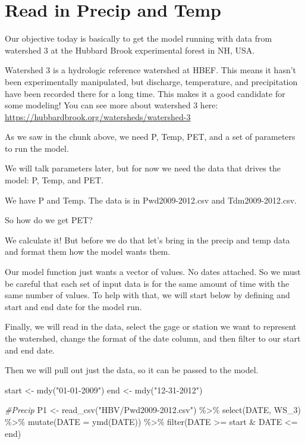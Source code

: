 \documentclass[
]{book}
\newenvironment{Shaded}{\begin{snugshade}}{\end{snugshade}}
\newcommand{\AttributeTok}[1]{\textcolor[rgb]{0.77,0.63,0.00}{#1}}
\newcommand{\CommentTok}[1]{\textcolor[rgb]{0.56,0.35,0.01}{\textit{#1}}}
\newcommand{\FunctionTok}[1]{\textcolor[rgb]{0.00,0.00,0.00}{#1}}
\newcommand{\NormalTok}[1]{#1}
\newcommand{\OtherTok}[1]{\textcolor[rgb]{0.56,0.35,0.01}{#1}}
\newcommand{\SpecialCharTok}[1]{\textcolor[rgb]{0.00,0.00,0.00}{#1}}
\newcommand{\StringTok}[1]{\textcolor[rgb]{0.31,0.60,0.02}{#1}}
\begin{document}
\hypertarget{read-in-precip-and-temp}{%
\section{Read in Precip and Temp}\label{read-in-precip-and-temp}}

Our objective today is basically to get the model running with data from watershed 3 at the Hubbard Brook experimental forest in NH, USA.

Watershed 3 is a hydrologic reference watershed at HBEF. This means it hasn't been experimentally manipulated, but discharge, temperature, and precipitation have been recorded there for a long time. This makes it a good candidate for some modeling! You can see more about watershed 3 here: \url{https://hubbardbrook.org/watersheds/watershed-3}

As we saw in the chunk above, we need P, Temp, PET, and a set of parameters to run the model.

We will talk parameters later, but for now we need the data that drives the model: P, Temp, and PET.

We have P and Temp. The data is in Pwd2009-2012.csv and Tdm2009-2012.csv.

So how do we get PET?

We calculate it! But before we do that let's bring in the precip and temp data and format them how the model wants them.

Our model function just wants a vector of values. No dates attached. So we must be careful that each set of input data is for the same amount of time with the same number of values. To help with that, we will start below by defining and start and end date for the model run.

Finally, we will read in the data, select the gage or station we want to represent the watershed, change the format of the date column, and then filter to our start and end date.

Then we will pull out just the data, so it can be passed to the model.

\begin{Shaded}
\begin{Highlighting}[]
\NormalTok{start }\OtherTok{\textless{}{-}} \FunctionTok{mdy}\NormalTok{(}\StringTok{"01{-}01{-}2009"}\NormalTok{)}
\NormalTok{end }\OtherTok{\textless{}{-}} \FunctionTok{mdy}\NormalTok{(}\StringTok{"12{-}31{-}2012"}\NormalTok{)}

\CommentTok{\#Precip}
\NormalTok{P1 }\OtherTok{\textless{}{-}} \FunctionTok{read\_csv}\NormalTok{(}\StringTok{"HBV/Pwd2009{-}2012.csv"}\NormalTok{) }\SpecialCharTok{\%\textgreater{}\%} 
         \FunctionTok{select}\NormalTok{(DATE, WS\_3) }\SpecialCharTok{\%\textgreater{}\%}
         \FunctionTok{mutate}\NormalTok{(}\AttributeTok{DATE =} \FunctionTok{ymd}\NormalTok{(DATE)) }\SpecialCharTok{\%\textgreater{}\%}
         \FunctionTok{filter}\NormalTok{(DATE }\SpecialCharTok{\textgreater{}=}\NormalTok{ start }\SpecialCharTok{\&}\NormalTok{ DATE }\SpecialCharTok{\textless{}=}\NormalTok{ end)}
\end{Highlighting}
\end{Shaded}
\end{document}
